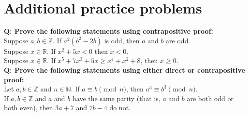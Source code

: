 \documentclass{article}
\begin{document}
\section{\sc Additional practice problems}
{\bf Q: Prove the following statements using contrapositive proof:}\\[1ex]
Suppose $a, b \in \mathbb{Z}$. If $a^2(b^2-2b)$ is odd, then $a$ and $b$ are odd.\\[1ex]
Suppose $x\in\mathbb{R}$. If $x^2 + 5 x < 0$ then $x < 0$.\\[1ex]
Suppose $x\in\mathbb{R}$. If $x^5 + 7x^3 + 5x \geq x^4 + x^2 + 8$, then $x\geq 0$.\\[1em]
{\bf Q: Prove the following statements using either direct or contrapositive proof:}\\[1ex]
Let $a, b \in\mathbb{Z}$ and $n\in\mathbb{N}$. If $a\equiv b\pmod n$, then $a^3\equiv b^3 \pmod n$.\\[1ex]
If $a, b \in\mathbb{Z}$ and $a$ and $b$ have the same parity (that is, $a$ and $b$ are both odd or both even), then $3 a + 7$ and $7 b -4$ do not.\\[1ex]
\end{document}
